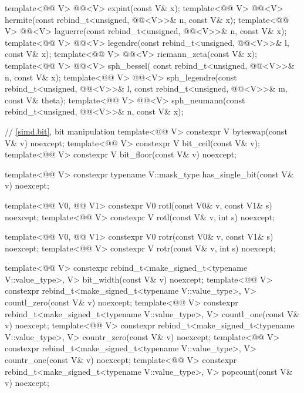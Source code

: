 \begin{codeblock}
{  template<@@ V> @@<V> expint(const V& x);
  template<@@ V>
    @@<V> hermite(const rebind_t<unsigned, @@<V>>& n, const V& x);
  template<@@ V>
    @@<V> laguerre(const rebind_t<unsigned, @@<V>>& n, const V& x);
  template<@@ V>
    @@<V> legendre(const rebind_t<unsigned, @@<V>>& l, const V& x);
  template<@@ V>
    @@<V> riemann_zeta(const V& x);
  template<@@ V>
    @@<V> sph_bessel(
      const rebind_t<unsigned, @@<V>>& n, const V& x);
  template<@@ V>
    @@<V> sph_legendre(const rebind_t<unsigned, @@<V>>& l,
      const rebind_t<unsigned, @@<V>>& m, const V& theta);
  template<@@ V>
    @@<V>
      sph_neumann(const rebind_t<unsigned, @@<V>>& n, const V& x);

  // \ref{simd.bit}, bit manipulation
  template<@@ V> constexpr V byteswap(const V& v) noexcept;
  template<@@ V> constexpr V bit_ceil(const V& v);
  template<@@ V> constexpr V bit_floor(const V& v) noexcept;

  template<@@ V>
    constexpr typename V::mask_type has_single_bit(const V& v) noexcept;

  template<@@ V0, @@ V1>
    constexpr V0 rotl(const V0& v, const V1& s) noexcept;
  template<@@ V>
    constexpr V  rotl(const V& v, int s) noexcept;

  template<@@ V0, @@ V1>
    constexpr V0 rotr(const V0& v, const V1& s) noexcept;
  template<@@ V>
    constexpr V  rotr(const V& v, int s) noexcept;

  template<@@ V>
    constexpr rebind_t<make_signed_t<typename V::value_type>, V>
      bit_width(const V& v) noexcept;
  template<@@ V>
    constexpr rebind_t<make_signed_t<typename V::value_type>, V>
      countl_zero(const V& v) noexcept;
  template<@@ V>
    constexpr rebind_t<make_signed_t<typename V::value_type>, V>
      countl_one(const V& v) noexcept;
  template<@@ V>
    constexpr rebind_t<make_signed_t<typename V::value_type>, V>
      countr_zero(const V& v) noexcept;
  template<@@ V>
    constexpr rebind_t<make_signed_t<typename V::value_type>, V>
      countr_one(const V& v) noexcept;
  template<@@ V>
    constexpr rebind_t<make_signed_t<typename V::value_type>, V>
      popcount(const V& v) noexcept;

}
\end{codeblock}
